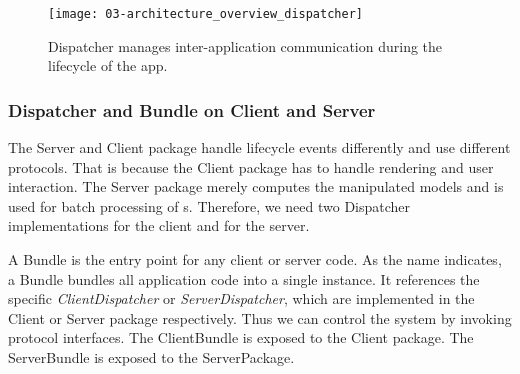 \documentclass[../ClassicThesis.tex]{subfiles}
\begin{document}


\begin{figure}
  \centering
  \texttt{[image: 03-architecture\_overview\_dispatcher]}
  \caption{Dispatcher manages inter-application communication during the
    lifecycle of the app.}
  \label{fig:architecture_overview_dispatcher}
\end{figure}

\subsubsection{Dispatcher and Bundle on Client and Server}


The Server and Client package handle lifecycle events differently and use
different protocols. That is because the Client package has to handle rendering
and user interaction. The Server package merely computes the manipulated models
and is used for batch processing of {\threedmodel}s. Therefore, we need two
Dispatcher implementations for the client and for the server.

A Bundle is the entry point for any client or server code. As the name
indicates, a Bundle bundles all application code into a single instance. It
references the specific \emph{ClientDispatcher} or \emph{ServerDispatcher},
which are implemented in the Client or Server package respectively. Thus we can
control the system by invoking protocol interfaces. The ClientBundle is exposed
to the Client package. The ServerBundle is exposed to the ServerPackage.
\end{document}

